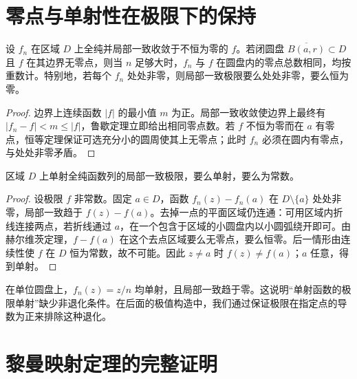 \section{零点与单射性在极限下的保持}

\begin{theorem}
\label{thm:ca-hurwitz}
设 $f_n$ 在区域 $D$ 上全纯并局部一致收敛于不恒为零的 $f$。若闭圆盘 $\overline{B(a,r)}\subset D$ 且 $f$ 在其边界无零点，则当 $n$ 足够大时，$f_n$ 与 $f$ 在圆盘内的零点总数相同，均按重数计。特别地，若每个 $f_n$ 处处非零，则局部一致极限要么处处非零，要么恒为零。
\end{theorem}
\begin{proof}
边界上连续函数 $|f|$ 的最小值 $m$ 为正。局部一致收敛使边界上最终有 $|f_n-f|<m\le|f|$，鲁歇定理立即给出相同零点数。若 $f$ 不恒为零而在 $a$ 有零点，恒等定理保证可选充分小的圆周使其上无零点；此时 $f_n$ 必须在圆内有零点，与处处非零矛盾。
\end{proof}

\begin{proposition}[单射函数列的极限]
\label{prop:ca-univalent-limit}
区域 $D$ 上单射全纯函数列的局部一致极限，要么单射，要么为常数。
\end{proposition}
\begin{proof}
设极限 $f$ 非常数。固定 $a\in D$，函数 $f_n(z)-f_n(a)$ 在 $D\setminus\{a\}$ 处处非零，局部一致趋于 $f(z)-f(a)$。去掉一点的平面区域仍连通：可用区域内折线连接两点，若折线通过 $a$，在一个包含于区域的小圆盘内以小圆弧绕开即可。由赫尔维茨定理，$f-f(a)$ 在这个去点区域要么无零点，要么恒零。后一情形由连续性使 $f$ 在 $D$ 恒为常数，故不可能。因此 $z\ne a$ 时 $f(z)\ne f(a)$；$a$ 任意，得到单射。
\end{proof}

\begin{example}[退化为常数不能排除]
在单位圆盘上，$f_n(z)=z/n$ 均单射，且局部一致趋于零。这说明“单射函数的极限单射”缺少非退化条件。在后面的极值构造中，我们通过保证极限在指定点的导数为正来排除这种退化。
\end{example}

\section{黎曼映射定理的完整证明}

